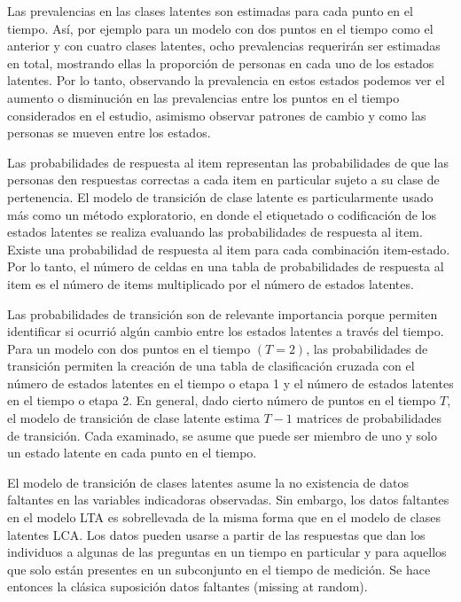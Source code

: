 			Las prevalencias en las clases latentes son estimadas para cada punto en el tiempo. As\'{i}, por ejemplo para un modelo con dos puntos en el tiempo como el anterior y con cuatro clases latentes, ocho prevalencias requerir\'{a}n ser estimadas en total, mostrando ellas la proporci\'{o}n de personas en cada uno de los estados latentes. Por lo tanto, observando la prevalencia en estos estados podemos ver el aumento o disminuci\'{o}n en las prevalencias entre los puntos en el tiempo considerados en el estudio, asimismo observar patrones de cambio y como las personas se mueven entre los estados.
			
			Las probabilidades de respuesta al item representan las probabilidades de que las personas den respuestas correctas a cada item en particular sujeto a su clase de pertenencia. El modelo de transici\'{o}n de clase latente es particularmente usado m\'{a}s como un m\'{e}todo exploratorio, en donde el etiquetado o codificaci\'{o}n  de los estados latentes se realiza evaluando las probabilidades de respuesta al item. Existe una probabilidad de respuesta al item para cada combinaci\'{o}n item-estado. Por lo tanto, el n\'{u}mero de celdas en una tabla de probabilidades de respuesta al item es el n\'{u}mero de items multiplicado por el n\'{u}mero de estados latentes.
			
			Las probabilidades de transici\'{o}n son de relevante importancia porque permiten identificar si ocurri\'{o} alg\'{u}n cambio entre los estados latentes a trav\'{e}s del tiempo. Para un modelo con dos puntos en el tiempo $(T=2)$, las probabilidades de transici\'{o}n permiten la creaci\'{o}n de una tabla de clasificaci\'{o}n cruzada con el n\'{u}mero de estados latentes en el tiempo o etapa 1 y el n\'{u}mero de estados latentes en el tiempo o etapa 2. En general, dado cierto n\'{u}mero de puntos en el tiempo $T$, el modelo de transici\'{o}n de clase latente estima $T-1$ matrices de probabilidades de transici\'{o}n. Cada examinado, se asume que puede ser miembro de uno y solo un estado latente en cada punto en el tiempo.
			
			El modelo de transici\'{o}n de clases latentes asume la no existencia de datos faltantes en las variables indicadoras observadas. Sin embargo, los datos faltantes en el modelo LTA es sobrellevada de la misma forma que en el modelo de clases latentes LCA. Los datos pueden usarse a partir de las respuestas que dan los individuos a algunas de las preguntas en un tiempo en particular y para aquellos que solo est\'{a}n presentes en un subconjunto en el tiempo de medici\'{o}n. Se hace entonces la cl\'{a}sica suposici\'{o}n datos faltantes (missing at random).
			
